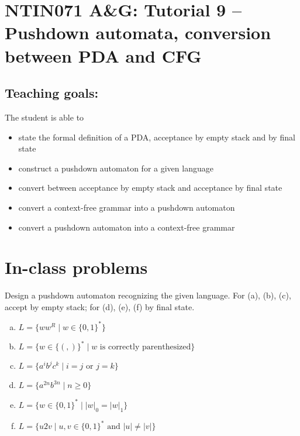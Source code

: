 \documentclass[a4paper,12pt]{amsart}
\begin{document}
\thispagestyle{empty}

\section*{NTIN071 A\&G: Tutorial 9 -- Pushdown automata, conversion between PDA and CFG}

\medskip

\subsection*{Teaching goals:} The student is able to

    \begin{itemize}\setlength{\itemsep}{0pt}
        \item state the formal definition of a PDA, acceptance by empty stack and by final state
        \item construct a pushdown automaton for a given language
        \item convert between acceptance by empty stack and acceptance by final state
        \item convert a context-free grammar into a pushdown automaton
        \item convert a pushdown automaton into a context-free grammar
    \end{itemize}


\section*{In-class problems}


\medskip\begin{problem}\label{problem:construct-pda}

    Design a pushdown automaton recognizing the given language. For (a), (b), (c), accept by empty stack; for (d), (e), (f) by final state.

    \medskip

    \begin{enumerate}[(a)]\setlength\itemsep{3pt}
        \item $L=\{ww^R\mid w\in \{0,1\}^*\}$
        \item $L=\{w\in\{(,)\}^*\mid w\text{ is correctly parenthesized}\}$
        \item $L=\{a^ib^jc^k\mid i=j \text{ or } j=k\} $
        \item $L=\{a^{2n}b^{3n}\mid n\geq 0\}$
        \item $L=\{w\in \{0,1\}^*\mid  |w|_0=|w|_1\} $
        \item $L=\{u2v\mid u,v\in \{0,1\}^*\text{ and }|u|\neq |v|\} $
    \end{enumerate}

\end{problem}
\end{document}
